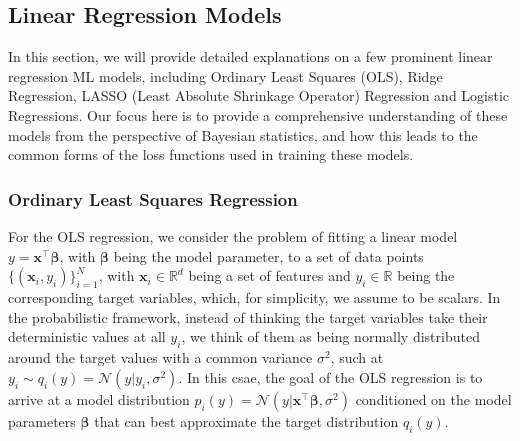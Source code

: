 \subsection{Linear Regression Models}\label{appendix:linear_regression}

In this section, we will provide detailed explanations on a few prominent linear regression ML models, including Ordinary Least Squares (OLS), Ridge Regression,\cite{hoerl1970ridge} LASSO (Least Absolute Shrinkage Operator) Regression\cite{tibshirani1996regression}  and Logistic Regressions.\cite{cox1958regression} Our focus here is to provide a comprehensive understanding of these models from the perspective of Bayesian statistics, and how this leads to the common forms of the loss functions used in training these models.

\subsubsection{Ordinary Least Squares Regression}\label{appendix:ols}

For the OLS regression, we consider the problem of fitting a linear model $y=\bm{x}^{\top}\boldsymbol{\beta}$, with $\boldsymbol{\beta}$ being the model parameter, to a set of data points $\{(\bm{x}_i,y_i)\}_{i=1}^{N}$, with $\bm{x}_i \in \mathbb{R}^d$ being a set of features and $y_i \in \mathbb{R}$ being the corresponding target variables, which, for simplicity, we assume to be scalars. In the probabilistic framework, instead of thinking the target variables take their deterministic values at all $y_i$, we think of them as being normally distributed around the target values with a common variance $\sigma^2$, such at $y_i\sim q_i(y)=\mathcal{N}(y|y_i,\sigma^2)$. In this csae, the goal of the OLS regression is to arrive at a model distribution $p_i(y)=\mathcal{N}(y|\bm{x}^{\top}\boldsymbol{\beta},\sigma^2)$ conditioned on the model parameters $\boldsymbol{\beta}$ that can best approximate the target distribution $q_i(y)$. 

